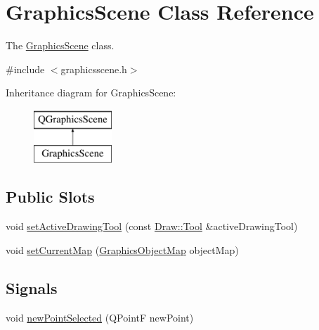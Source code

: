 \hypertarget{class_graphics_scene}{}\section{Graphics\+Scene Class Reference}
\label{class_graphics_scene}


The \hyperlink{class_graphics_scene}{Graphics\+Scene} class.  




{\ttfamily \#include $<$graphicsscene.\+h$>$}

Inheritance diagram for Graphics\+Scene\+:\begin{figure}[H]
\begin{center}
\leavevmode
\includegraphics[height=2.000000cm]{class_graphics_scene}
\end{center}
\end{figure}
\subsection*{Public Slots}
\begin{DoxyCompactItemize}
\item 
void \hyperlink{class_graphics_scene_a99831b8b30259a344715f95d65427465}{set\+Active\+Drawing\+Tool} (const \hyperlink{class_draw_aef97a848de7a634c35c3ce678be88b9b}{Draw\+::\+Tool} \&active\+Drawing\+Tool)
\item 
void \hyperlink{class_graphics_scene_a48f32ef7c39d728cc7c7eb9d21dbffca}{set\+Current\+Map} (\hyperlink{class_graphics_object_map}{Graphics\+Object\+Map} object\+Map)
\end{DoxyCompactItemize}
\subsection*{Signals}
\begin{DoxyCompactItemize}
\item 
void \hyperlink{class_graphics_scene_acfc07dfc3d559fc497cde524dc8ffa66}{new\+Point\+Selected} (Q\+PointF new\+Point)
\end{DoxyCompactItemize}

